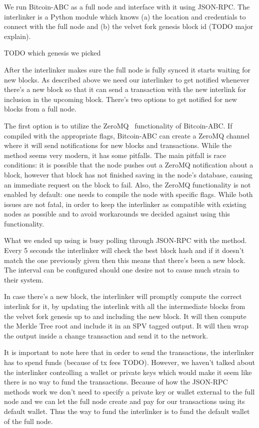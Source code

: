 We run Bitcoin-ABC as a full node and interface with it using JSON-RPC. The interlinker is a Python module which knows (a) the location and credentials to connect with the full node and (b) the velvet fork genesis block id (TODO major explain).

TODO which genesis we picked

After the interlinker makes sure the full node is fully synced it starts waiting for new blocks. As described above we need our interlinker to get notified whenever there's a new block so that it can send a transaction with the new interlink for inclusion in the upcoming block. There's two options to get notified for new blocks from a full node.

The first option is to utilize the ZeroMQ~\cite{zmq} functionality of Bitcoin-ABC. If compiled with the appropriate flags, Bitcoin-ABC can create a ZeroMQ channel where it will send notifications for new blocks and transactions. While the method seems very modern, it has some pitfalls. The main pitfall is race conditions: it is possible that the node pushes out a ZeroMQ notification about a block, however that block has not finished saving in the node's database, causing an immediate  request on the block to fail. Also, the ZeroMQ functionality is not enabled by default: one needs to compile the node with specific flags. While both issues are not fatal, in order to keep the interlinker as compatible with existing nodes as possible and to avoid workarounds we decided against using this functionality.

What we ended up using is busy polling through JSON-RPC with the  method. Every 5 seconds the interlinker will check the best block hash and if it doesn't match the one previously given then this means that there's been a new block. The interval can be configured should one desire not to cause much strain to their system.

In case there's a new block, the interlinker will promptly compute the correct interlink for it, by updating the interlink with all the intermediate blocks from the velvet fork genesis up to and including the new block. It will then compute the Merkle Tree root and include it in an SPV tagged output. It will then wrap the output inside a change transaction and send it to the network.

It is important to note here that in order to send the transactions, the interlinker has to spend funds (because of tx fees TODO). However, we haven't talked about the interlinker controlling a wallet or private keys which would make it seem like there is no way to fund the transactions. Because of how the JSON-RPC methods work we don't need to specify a private key or wallet external to the full node and we can let the full node create and pay for our transactions using its default wallet. Thus the way to fund the interlinker is to fund the default wallet of the full node.

